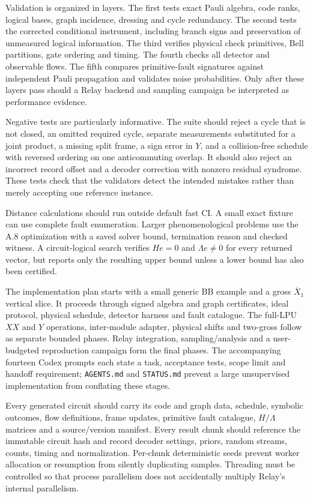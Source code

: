 \documentclass[11pt,a4paper]{article}
\newcommand{\lx}{\overline{X}}
\begin{document}
Validation is organized in layers. The first tests exact Pauli algebra, code ranks, logical bases, graph incidence, dressing and cycle redundancy. The second tests the corrected conditional instrument, including branch signs and preservation of unmeasured logical information. The third verifies physical check primitives, Bell partitions, gate ordering and timing. The fourth checks all detector and observable flows. The fifth compares primitive-fault signatures against independent Pauli propagation and validates noise probabilities. Only after these layers pass should a Relay backend and sampling campaign be interpreted as performance evidence.

Negative tests are particularly informative. The suite should reject a cycle that is not closed, an omitted required cycle, separate measurements substituted for a joint product, a missing split frame, a sign error in $Y$, and a collision-free schedule with reversed ordering on one anticommuting overlap. It should also reject an incorrect record offset and a decoder correction with nonzero residual syndrome. These tests check that the validators detect the intended mistakes rather than merely accepting one reference instance.

Distance calculations should run outside default fast CI. A small exact fixture can use complete fault enumeration. Larger phenomenological problems use the A.8 optimization with a saved solver bound, termination reason and checked witness. A circuit-logical search verifies $He=0$ and $\Lambda e\ne0$ for every returned vector, but reports only the resulting upper bound unless a lower bound has also been certified.

The implementation plan starts with a small generic BB example and a gross $\lx_1$ vertical slice. It proceeds through signed algebra and graph certificates, ideal protocol, physical schedule, detector harness and fault catalogue. The full-LPU $XX$ and $Y$ operations, inter-module adapter, physical shifts and two-gross follow as separate bounded phases. Relay integration, sampling/analysis and a user-budgeted reproduction campaign form the final phases. The accompanying fourteen Codex prompts each state a task, acceptance tests, scope limit and handoff requirement; \texttt{AGENTS.md} and \texttt{STATUS.md} prevent a large unsupervised implementation from conflating these stages.

Every generated circuit should carry its code and graph data, schedule, symbolic outcomes, flow definitions, frame updates, primitive fault catalogue, $H/\Lambda$ matrices and a source/version manifest. Every result chunk should reference the immutable circuit hash and record decoder settings, priors, random streams, counts, timing and normalization. Per-chunk deterministic seeds prevent worker allocation or resumption from silently duplicating samples. Threading must be controlled so that process parallelism does not accidentally multiply Relay's internal parallelism.
\end{document}
